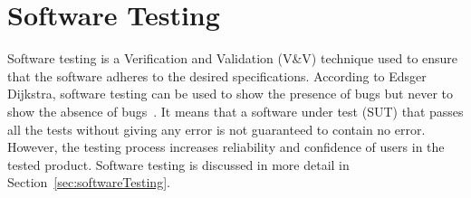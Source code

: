 

\section{Software Testing} 
Software testing is a Verification and Validation (V\&V) technique used to ensure that the software adheres to the desired specifications. According to Edsger Dijkstra, software testing can be used to show the presence of bugs but never to show the absence of bugs~\cite{dahl1972structured}. It means that a software under test (SUT) that passes all the tests without giving any error is not guaranteed to contain no error. However, the testing process increases reliability and confidence of users in the tested product. Software testing is discussed in more detail in Section~\ref{sec:softwareTesting}.

